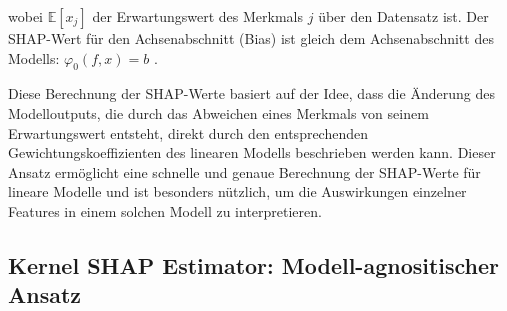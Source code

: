 wobei \( \mathbb{E}[x_j] \) der Erwartungswert des Merkmals \( j \) über den 
Datensatz ist. Der SHAP-Wert für den Achsenabschnitt (Bias) ist gleich 
dem Achsenabschnitt des Modells: \( \varphi_0(f, x) = b \) \cite[S. 6]{NIPS2017_8a20a862}.

Diese Berechnung der SHAP-Werte basiert auf der Idee, dass die Änderung 
des Modelloutputs, die durch das Abweichen eines Merkmals von seinem 
Erwartungswert entsteht, direkt durch den entsprechenden Gewichtungskoeffizienten 
des linearen Modells beschrieben werden kann. Dieser Ansatz ermöglicht eine 
schnelle und genaue Berechnung der SHAP-Werte für lineare Modelle und ist 
besonders nützlich, um die Auswirkungen einzelner Features in einem solchen 
Modell zu interpretieren.

\subsection{Kernel SHAP Estimator: Modell-agnositischer Ansatz}